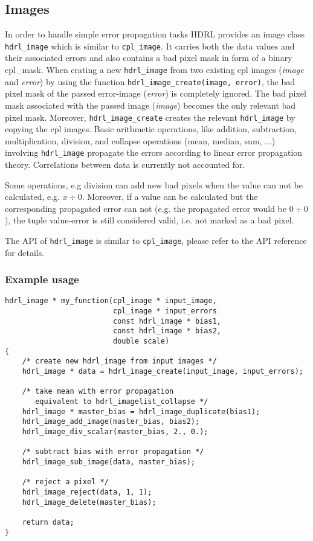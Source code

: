 \subsection{Images}

In order to handle simple error propagation tasks HDRL provides an
image class \verb+hdrl_image+ which is similar to \verb+cpl_image+.
It carries both the data values and their associated errors and also
contains a bad pixel mask in form of a binary cpl\_mask.  When crating
a new \verb+hdrl_image+ from two existing cpl images (\textit{image}
and \textit{error}) by using the function
\verb+hdrl_image_create(image, error)+, the bad pixel mask of the
passed error-image (\textit{error}) is completely ignored. The bad
pixel mask associated with the passed image (\textit{image}) becomes
the only relevant bad pixel mask. Moreover, \verb+hdrl_image_create+
creates the relevant \verb+hdrl_image+ by copying the cpl images.
Basic arithmetic operations, like addition, subtraction,
multiplication, division, and collapse operations (mean, median, sum,
...) involving \verb+hdrl_image+ propagate the errors according to
linear error propagation theory.  Correlations between data is
currently not accounted for. 

Some operations, e.g division can add new bad pixels when the value
can not be calculated, e.g. $x \div 0$.  Moreover, if a value can be
calculated but the corresponding propagated error can not (e.g. the
propagated error would be $0 \div 0$), the tuple value-error is still
considered valid, i.e. not marked as a bad pixel.
 
The API of \verb+hdrl_image+ is similar to \verb+cpl_image+, please refer to
the API reference for details.

\subsubsection{Example usage}

\begin{lstlisting}
hdrl_image * my_function(cpl_image * input_image,
                         cpl_image * input_errors
                         const hdrl_image * bias1,
                         const hdrl_image * bias2,
                         double scale)
{
    /* create new hdrl_image from input images */
    hdrl_image * data = hdrl_image_create(input_image, input_errors);

    /* take mean with error propagation
       equivalent to hdrl_imagelist_collapse */
    hdrl_image * master_bias = hdrl_image_duplicate(bias1);
    hdrl_image_add_image(master_bias, bias2);
    hdrl_image_div_scalar(master_bias, 2., 0.);

    /* subtract bias with error propagation */
    hdrl_image_sub_image(data, master_bias);

    /* reject a pixel */
    hdrl_image_reject(data, 1, 1);
    hdrl_image_delete(master_bias);

    return data;
}
\end{lstlisting}
